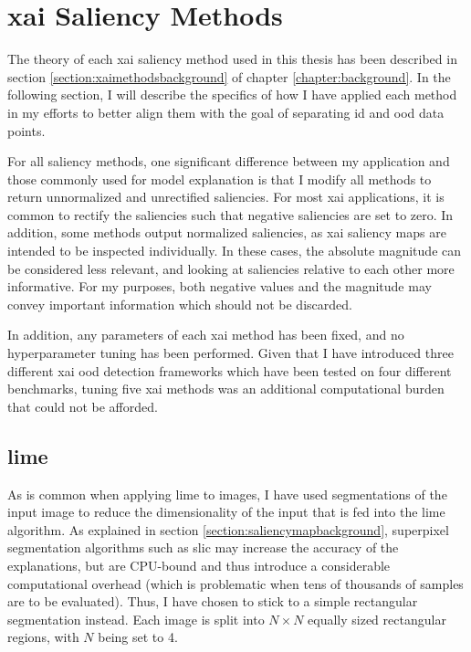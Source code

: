 \documentclass[UKenglish]{uiomasterthesis} %
\theoremstyle{definition}
\begin{document}
\section{\ac{xai} Saliency Methods} \label{section:methodology_xai}

The theory of each \ac{xai} saliency method used in this thesis has been described in section \ref{section:xaimethodsbackground} of chapter \ref{chapter:background}. In the following section, I will describe the specifics of how I have applied each method in my efforts to better align them with the goal of separating \ac{id} and \ac{ood} data points.

For all saliency methods, one significant difference between my application and those commonly used for model explanation is that I modify all methods to return unnormalized and unrectified saliencies. For most \ac{xai} applications, it is common to rectify the saliencies such that negative saliencies are set to zero. In addition, some methods output normalized saliencies, as \ac{xai} saliency maps are intended to be inspected individually. In these cases, the absolute magnitude can be considered less relevant, and looking at saliencies relative to each other more informative. For my purposes, both negative values and the magnitude may convey important information which should not be discarded.

In addition, any parameters of each \ac{xai} method has been fixed, and no hyperparameter tuning has been performed. Given that I have introduced three different \ac{xai} \ac{ood} detection frameworks which have been tested on four different benchmarks, tuning five \ac{xai} methods was an additional computational burden that could not be afforded.

\subsection{\ac{lime}}

As is common when applying \ac{lime} to images, I have used segmentations of the input image to reduce the dimensionality of the input that is fed into the \ac{lime} algorithm. As explained in section \ref{section:saliencymapbackground}, superpixel segmentation algorithms such as \ac{slic} may increase the accuracy of the explanations, but are CPU-bound and thus introduce a considerable computational overhead (which is problematic when tens of thousands of samples are to be evaluated). Thus, I have chosen to stick to a simple rectangular segmentation instead. Each image is split into $N \times N$ equally sized rectangular regions, with $N$ being set to 4.
\end{document}
